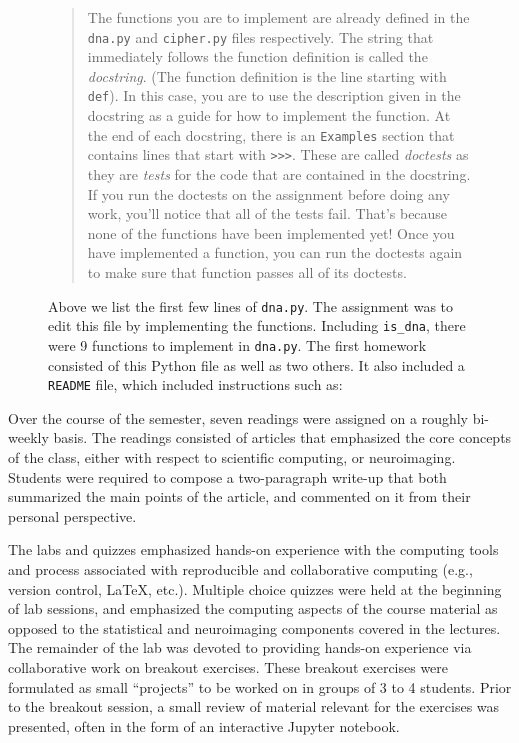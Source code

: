 
\begin{figure}
\centering

\caption{Above we list the first few lines of \texttt{dna.py}.
The assignment was to edit this file by implementing the functions.
Including \texttt{is\_dna}, there were 9 functions
to implement in \texttt{dna.py}.
The first homework consisted of this Python file as well as two others.
It also included a \texttt{README} file, which included instructions
such as:}\label{fig:dna}
\begin{quotation}
The functions you are to implement are already defined in the \texttt{dna.py} and
\texttt{cipher.py} files respectively. The string that immediately follows the function
definition is called the \emph{docstring}. (The function definition is the line
starting with \texttt{def}). In this case, you are to use the description given in the
docstring as a guide for how to implement the function. At the end of each
docstring, there is an \texttt{Examples} section that contains lines that start with
\verb|>>>|. These are called \emph{doctests} as they are \emph{tests} for the code that are
contained in the docstring. If you run the doctests on the assignment before
doing any work, you'll notice that all of the tests fail. That's because none
of the functions have been implemented yet! Once you have implemented a
function, you can run the doctests again to make sure that function passes all
of its doctests.
\end{quotation}
\end{figure}

Over the course of the semester, seven readings were assigned on a roughly
bi-weekly basis.
The readings consisted of articles that emphasized the core concepts
of the class, either with respect to scientific computing, or neuroimaging.
Students were required to compose a two-paragraph write-up that both summarized
the main points of the article, and commented on it from their personal
perspective.

The labs and quizzes emphasized hands-on experience with the computing tools
and process associated with reproducible and collaborative computing (e.g.,
version control, \LaTeX, etc.).
Multiple choice quizzes were held at the beginning of lab sessions, and
emphasized the computing aspects of the course material as
opposed to the statistical and neuroimaging components covered in the lectures.
The remainder of the lab was devoted to providing hands-on experience via
collaborative work on breakout exercises.
These breakout exercises were formulated as small ``projects'' to be worked on
in groups of 3 to 4 students.
Prior to the breakout session, a small review of material relevant for the 
exercises was presented, often in the form of an interactive Jupyter notebook.

